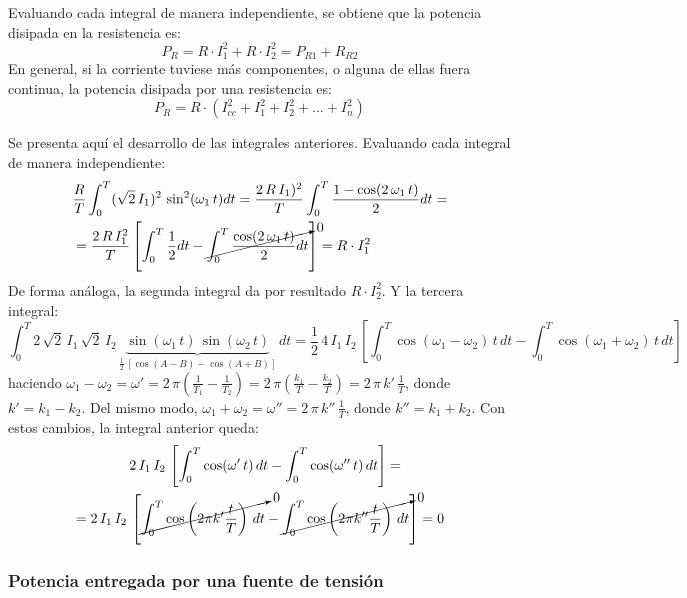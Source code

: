 Evaluando cada integral de manera independiente, se obtiene que la
potencia disipada en la resistencia es:
\begin{equation*}
  P_R=R\cdot I_1^2+R\cdot I_2^2 = P_{R1} + R_{R2}
\end{equation*}
En general, si la corriente tuviese más componentes, o alguna de ellas
fuera continua, la potencia disipada por una resistencia es:
\begin{equation}\label{eq.P_R_superposicion}
  \boxed{P_R=R\cdot\left(I_{cc}^2+I_1^2+I_2^2+...+I_n^2 \right)}
\end{equation}
\begin{remark}
  Se presenta aquí el desarrollo de las integrales
  anteriores. Evaluando cada integral de manera independiente:
  \begin{align*}
    &\dfrac{R}{T} \int_0^T (\sqrt{2}\,I_{1})^2\,\sin^2(\omega_1\,t)dt=\dfrac{2\,R\,I_{1})^2}{T}\int_0^T\dfrac{1-\cos(2\,\omega_1\,t)}{2}dt=\\
    &=\dfrac{2\,R\,I_{1}^2}{T}\left[\int_0^T\dfrac{1}{2}dt-\cancelto{0}{\int_0^T \dfrac{\cos(2\,\omega_1\,t)}{2}dt}\right]=R\cdot I_1^2
  \end{align*}
  De forma análoga, la segunda integral da por resultado
  $R\cdot I_2^2$. Y la tercera integral:
  \begin{equation*}
    \int_0^T 2\,\sqrt{2}\,I_{1}\, \sqrt{2}\,I_{2}\,\underbrace{\sin(\omega_1\,t)\,\sin(\omega_2\,t)}_{\frac{1}{2}\,\left[\cos(A-B)-\cos(A+B)\right]}\,dt=\dfrac{1}{2}\,4\,I_1\,I_2\,\left[\int_0^T\cos(\omega_1-\omega_2)\,t\,dt-\int_0^T\cos(\omega_1+\omega_2)\,t\,dt\right]
  \end{equation*}
  haciendo
  $\omega_1-\omega_2=\omega'=2\,\pi\left(\frac{1}{T_1}-\frac{1}{T_2}
  \right)=2\,\pi\left(\frac{k_1}{T}-\frac{k_2}{T}\right)=2\,\pi\,k'\,\frac{1}{T}$,
  donde $k'=k_1-k_2$. Del mismo modo,
  $\omega_1+\omega_2=\omega''=2\,\pi\,k''\,\frac{1}{T}$, donde
  $k''=k_1+k_2$. Con estos cambios, la integral anterior queda:
  \begin{align*}
    &2\,I_1\,I_2\,\left[\int_0^T\cos(\omega'\,t)\,dt-\int_0^T\cos(\omega''\,t)\,dt\right]=\\
    =2\,I_1\,I_2\,&\left[\cancelto{0}{\int_0^T \cos\left(2\pi k'\dfrac{t}{T}\right)\,dt}-\cancelto{0}{\int_0^T\cos\left(2\pi k''\dfrac{t}{T}\right)\,dt}\right]=0
  \end{align*}
\end{remark}


\subsubsection{Potencia entregada por una fuente de tensión}
    
